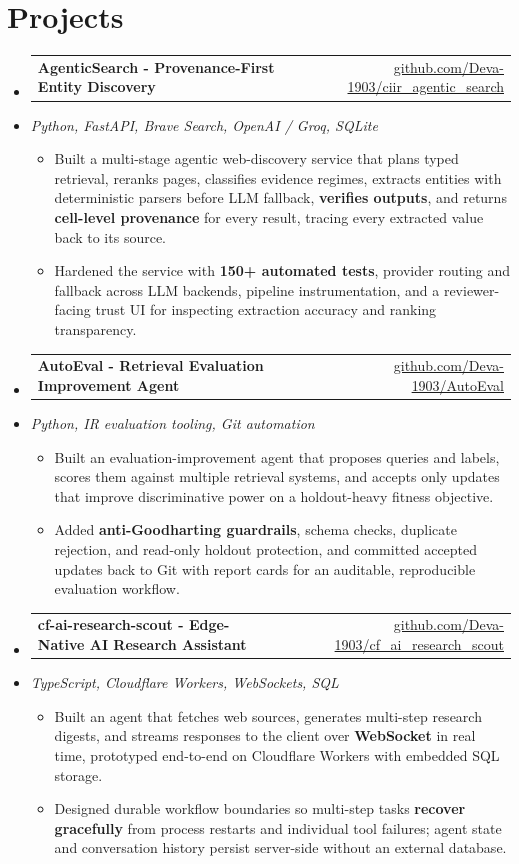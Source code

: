 \documentclass[letterpaper,10pt]{article}
\makeatletter
\newcommand{\resumeItem}[1]{
  \item\small{#1\vspace{-1pt}}
}
\newcommand{\resumeProjectHeading}[2]{
    \item
    \begin{tabular*}{0.985\textwidth}[t]{l@{\extracolsep{\fill}}r}
      \small\textbf{#1} & \small #2 \\
    \end{tabular*}\vspace{-5pt}
}
\newcommand{\resumeProjectSubheading}[1]{
  \vspace{-2pt}\item[] {\small\textcolor{ResumeSlate}{\emph{#1}}}\vspace{-3pt}
}
\newcommand{\resumeSubHeadingListStart}{\begin{itemize}[leftmargin=0.0in, label={}, itemsep=2pt, topsep=2pt]}
\newcommand{\resumeSubHeadingListEnd}{\end{itemize}}
\newcommand{\resumeItemListStart}{\begin{itemize}[leftmargin=0.18in, itemsep=2pt, topsep=1pt]}
\newcommand{\resumeItemListEnd}{\end{itemize}\vspace{-4pt}}
\makeatother
\begin{document}
\section{Projects}
\resumeSubHeadingListStart
  \resumeProjectHeading
    {AgenticSearch - Provenance-First Entity Discovery}
    {\href{https://github.com/Deva-1903/ciir_agentic_search}{github.com/Deva-1903/ciir\_agentic\_search}}
  \resumeProjectSubheading{Python, FastAPI, Brave Search, OpenAI / Groq, SQLite}
    \resumeItemListStart
      \resumeItem{Built a multi-stage agentic web-discovery service that plans typed retrieval, reranks pages, classifies evidence regimes, extracts entities with deterministic parsers before LLM fallback, \textbf{verifies outputs}, and returns \textbf{cell-level provenance} for every result, tracing every extracted value back to its source.}
      \resumeItem{Hardened the service with \textbf{150+ automated tests}, provider routing and fallback across LLM backends, pipeline instrumentation, and a reviewer-facing trust UI for inspecting extraction accuracy and ranking transparency.}
    \resumeItemListEnd
  \resumeProjectHeading
    {AutoEval - Retrieval Evaluation Improvement Agent}
    {\href{https://github.com/Deva-1903/AutoEval}{github.com/Deva-1903/AutoEval}}
  \resumeProjectSubheading{Python, IR evaluation tooling, Git automation}
    \resumeItemListStart
      \resumeItem{Built an evaluation-improvement agent that proposes queries and labels, scores them against multiple retrieval systems, and accepts only updates that improve discriminative power on a holdout-heavy fitness objective.}
      \resumeItem{Added \textbf{anti-Goodharting guardrails}, schema checks, duplicate rejection, and read-only holdout protection, and committed accepted updates back to Git with report cards for an auditable, reproducible evaluation workflow.}
    \resumeItemListEnd
  \resumeProjectHeading
    {cf-ai-research-scout - Edge-Native AI Research Assistant}
    {\href{https://github.com/Deva-1903/cf_ai_research_scout}{github.com/Deva-1903/cf\_ai\_research\_scout}}
  \resumeProjectSubheading{TypeScript, Cloudflare Workers, WebSockets, SQL}
    \resumeItemListStart
      \resumeItem{Built an agent that fetches web sources, generates multi-step research digests, and streams responses to the client over \textbf{WebSocket} in real time, prototyped end-to-end on Cloudflare Workers with embedded SQL storage.}
      \resumeItem{Designed durable workflow boundaries so multi-step tasks \textbf{recover gracefully} from process restarts and individual tool failures; agent state and conversation history persist server-side without an external database.}
    \resumeItemListEnd
\resumeSubHeadingListEnd
\vspace{-4pt}
\end{document}

